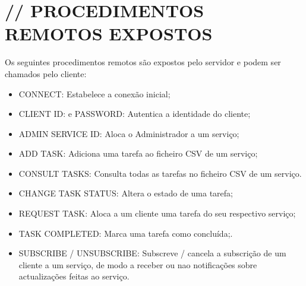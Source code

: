 \documentclass[12pt]{article}
\begin{document}
\section{// PROCEDIMENTOS REMOTOS EXPOSTOS}
Os seguintes procedimentos remotos são expostos pelo servidor e podem ser chamados pelo cliente:
\begin{itemize}
\item CONNECT: Estabelece a conexão inicial;
\item CLIENT ID: e PASSWORD: Autentica a identidade do cliente;
\item ADMIN SERVICE ID: Aloca o Administrador a um serviço;
\item ADD TASK: Adiciona uma tarefa ao ficheiro CSV de um serviço;
\item CONSULT TASKS: Consulta todas as tarefas no ficheiro CSV de um serviço.
\item CHANGE TASK STATUS: Altera o estado de uma tarefa;
\item REQUEST TASK: Aloca a um cliente uma tarefa do seu respectivo serviço;
\item TASK COMPLETED: Marca uma tarefa como concluída;.
\item SUBSCRIBE / UNSUBSCRIBE: Subscreve / cancela a subscrição de um cliente a um serviço, de modo a receber ou nao notificações sobre actualizações feitas ao serviço.
\end{itemize}
\end{document}
